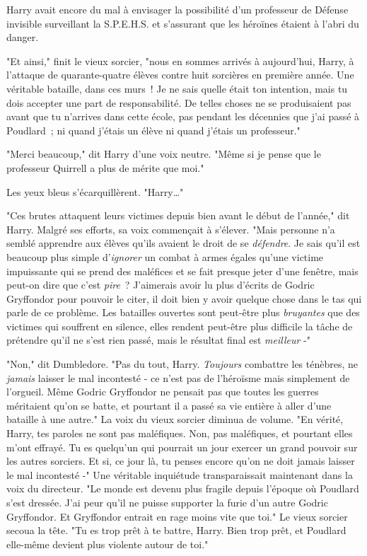 Harry avait encore du mal à envisager la possibilité d'un professeur de Défense invisible surveillant la S.P.E.H.S. et s'assurant que les héroïnes étaient à l'abri du danger.

"Et ainsi," finit le vieux sorcier, "nous en sommes arrivés à aujourd'hui, Harry, à l'attaque de quarante-quatre élèves contre huit sorcières en première année. Une véritable bataille, dans ces murs~! Je ne sais quelle était ton intention, mais tu dois accepter une part de responsabilité. De telles choses ne se produisaient pas avant que tu n'arrives dans cette école, pas pendant les décennies que j'ai passé à Poudlard~; ni quand j'étais un élève ni quand j'étais un professeur."

"Merci beaucoup," dit Harry d'une voix neutre. "Même si je pense que le professeur Quirrell a plus de mérite que moi."

Les yeux bleus s'écarquillèrent. "Harry…"

"Ces brutes attaquent leurs victimes depuis bien avant le début de l'année," dit Harry. Malgré ses efforts, sa voix commençait à s'élever. "Mais personne n'a semblé apprendre aux élèves qu'ils avaient le droit de se \emph{défendre}. Je sais qu'il est beaucoup plus simple d'\emph{ignorer} un combat à armes égales qu'une victime impuissante qui se prend des maléfices et se fait presque jeter d'une fenêtre, mais peut-on dire que c'est \emph{pire}~? J'aimerais avoir lu plus d'écrits de Godric Gryffondor pour pouvoir le citer, il doit bien y avoir quelque chose dans le tas qui parle de ce problème. Les batailles ouvertes sont peut-être plus \emph{bruyantes} que des victimes qui souffrent en silence, elles rendent peut-être plus difficile la tâche de prétendre qu'il ne s'est rien passé, mais le résultat final est \emph{meilleur} -"

"Non," dit Dumbledore. "Pas du tout, Harry. \emph{Toujours} combattre les ténèbres, ne \emph{jamais} laisser le mal incontesté - ce n'est pas de l'héroïsme mais simplement de l'orgueil. Même Godric Gryffondor ne pensait pas que toutes les guerres méritaient qu'on se batte, et pourtant il a passé sa vie entière à aller d'une bataille à une autre." La voix du vieux sorcier diminua de volume. "En vérité, Harry, tes paroles ne sont pas maléfiques. Non, pas maléfiques, et pourtant elles m'ont effrayé. Tu es quelqu'un qui pourrait un jour exercer un grand pouvoir sur les autres sorciers. Et si, ce jour là, tu penses encore qu'on ne doit jamais laisser le mal incontesté -" Une véritable inquiétude transparaissait maintenant dans la voix du directeur. "Le monde est devenu plus fragile depuis l'époque où Poudlard s'est dressée. J'ai peur qu'il ne puisse supporter la furie d'un autre Godric Gryffondor. Et Gryffondor entrait en rage moins vite que toi." Le vieux sorcier secoua la tête. "Tu es trop prêt à te battre, Harry. Bien trop prêt, et Poudlard elle-même devient plus violente autour de toi."

